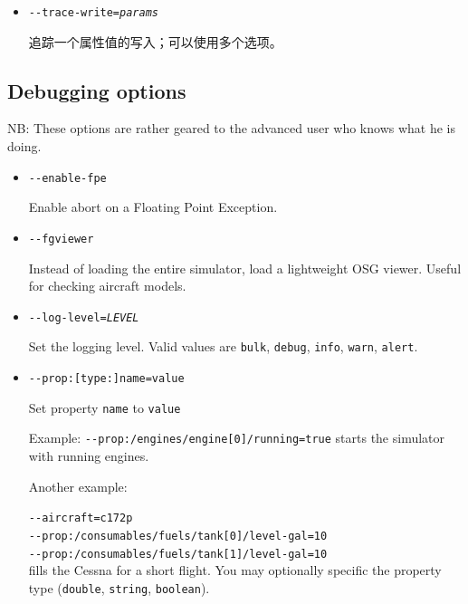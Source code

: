 \begin{itemize}
{\begin{itemize}
  \item{\texttt{-$ $-trace-write={\it params}}}
   
   追踪一个属性值的写入；可以使用多个选项。
\end{itemize}
}

\fi
\iffalse
{

  \subsection{Debugging options}

  NB: These options are rather geared to the advanced user who knows what he is doing.

  \begin{itemize}

  \item{\texttt{-$ $-enable-fpe}}

  Enable abort on a Floating Point Exception.

  \item{\texttt{-$ $-fgviewer}}

  Instead of loading the entire simulator, load a lightweight OSG viewer. Useful for checking aircraft
  models.

  \item{\texttt{-$ $-log-level={\it LEVEL}}}

  Set the logging level. Valid values are \texttt{bulk}, \texttt{debug}, \texttt{info}, \texttt{warn}, \texttt{alert}.

  \item{\texttt{-$ $-prop:[type:]name=value}}

  Set property \texttt{name} to \texttt{value}

  Example: \texttt{-$ $-prop:/engines/engine[0]/running=true} starts the simulator with running engines.

  Another example:

  \texttt{-$ $-aircraft=c172p}\\
  \texttt{-$ $-prop:/consumables/fuels/tank[0]/level-gal=10}\\
  \texttt{-$ $-prop:/consumables/fuels/tank[1]/level-gal=10}\\

  fills the Cessna for a short flight. You may optionally specific
  the property type (\texttt{double}, \texttt{string}, \texttt{boolean}).


\end{itemize}}
\end{itemize}
